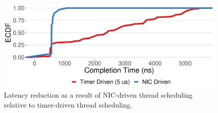 \begin{figure}
  \includegraphics[width=\linewidth]{./figures/scheduling-comptimes}
  \caption{Latency reduction as a result of NIC-driven thread scheduling relative to timer-driven thread scheduling.}
  \label{fig:scheduling-latency}
\end{figure}


